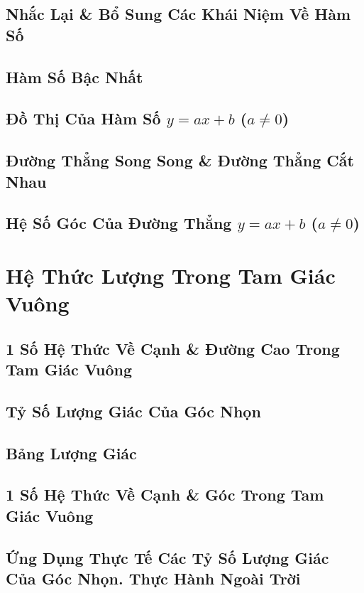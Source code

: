 \documentclass{article}
\numberwithin{equation}{section}
\begin{document}
\subsection{Nhắc Lại \& Bổ Sung Các Khái Niệm Về Hàm Số}

\subsection{Hàm Số Bậc Nhất}

\subsection{Đồ Thị Của Hàm Số $y = ax + b$ ($a\ne 0$)}

\subsection{Đường Thẳng Song Song \& Đường Thẳng Cắt Nhau}

\subsection{Hệ Số Góc Của Đường Thẳng $y = ax + b$ ($a\ne 0$)}

\section{Hệ Thức Lượng Trong Tam Giác Vuông}

\subsection{1 Số Hệ Thức Về Cạnh \& Đường Cao Trong Tam Giác Vuông}

\subsection{Tỷ Số Lượng Giác Của Góc Nhọn}

\subsection{Bảng Lượng Giác}

\subsection{1 Số Hệ Thức Về Cạnh \& Góc Trong Tam Giác Vuông}

\subsection{Ứng Dụng Thực Tế Các Tỷ Số Lượng Giác Của Góc Nhọn. Thực Hành Ngoài Trời}
\end{document}
